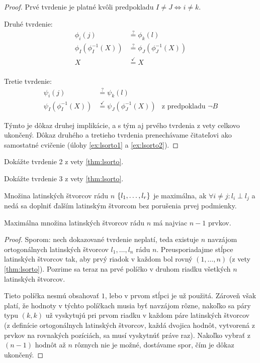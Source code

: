 \begin{proof}
Prvé tvrdenie je platné kvôli predpokladu $I \neq J \Longleftrightarrow i \neq k$.

Druhé tvrdenie:
\begin{align*}
\phi_i(j) &\overset{?}{=} \phi_k(l)\\
\phi_I(\phi_I^{-1}(X)) &\overset{?}{=} \phi_J(\phi_J^{-1}(X))\\
X &\overset{\checkmark}{=} X\\
\end{align*}

Tretie tvrdenie:
\begin{align*}
\psi_i(j) &\overset{?}{=} \psi_k(l)\\
\psi_I(\phi_I^{-1}(X)) &\overset{\checkmark}{=} \psi_J(\phi_J^{-1}(X))&\text{z predpokladu $\neg B$}
\end{align*}

Týmto je dôkaz druhej implikácie, a s tým aj prvého tvrdenia z vety celkovo ukončený.
Dôkaz druhého a tretieho tvrdenia prenechávame čitateľovi ako samostatné cvičenie (úlohy \ref{ex:lsorto1} a \ref{ex:lsorto2}).
\end{proof}

\begin{exercise}
\label{ex:lsorto1}
Dokážte tvrdenie 2 z vety \ref{thm:lsorto}.
\end{exercise}

\begin{exercise}
\label{ex:lsorto2}
Dokážte tvrdenie 3 z vety \ref{thm:lsorto}.
\end{exercise}




\begin{definition}
Množina latinských štvorcov rádu $n$ $\left\{l_1, \ldots, l_r\right\}$ je maximálna, ak $\forall i \neq j: l_i \perp l_j$ a 
nedá sa doplniť ďalším latinským štvorcom bez porušenia prvej podmienky. 
\end{definition}

\begin{theorem}
Maximálna množina latinských štvorcov rádu $n$ má najviac $n-1$ prvkov.
\end{theorem}


\begin{proof}
Sporom: nech dokazované tvrdenie neplatí, teda existuje $n$ navzájom ortogonálnych latinských štvorcov $l_1, \ldots, l_n$ rádu $n$.
Preusporiadajme stĺpce latinských štvorcov tak, aby prvý riadok v každom bol rovný $(1, \ldots, n)$ (z vety \ref{thm:lsorto}).
Pozrime sa teraz na prvé políčko v druhom riadku všetkých $n$ latinských štvorcov.

Tieto políčka nesmú obsahovať $1$, lebo v prvom stĺpci je už použitá.
Zároveň však platí, že hodnoty v týchto políčkach musia byť navzájom rôzne, nakoľko sa páry typu $(k, k)$ už vyskytujú pri prvom riadku v každom páre latinských štvorcov (z definície ortogonálnych latinských štvorcov, každá dvojica hodnôt, vytvorená z prvkov na rovnakých pozíciách, sa musí vyskytnúť práve raz).
Nakoľko vybrať z $(n-1)$ hodnôt až $n$ rôznych nie je možné, dostávame spor, čím je dôkaz ukončený.
\end{proof}


